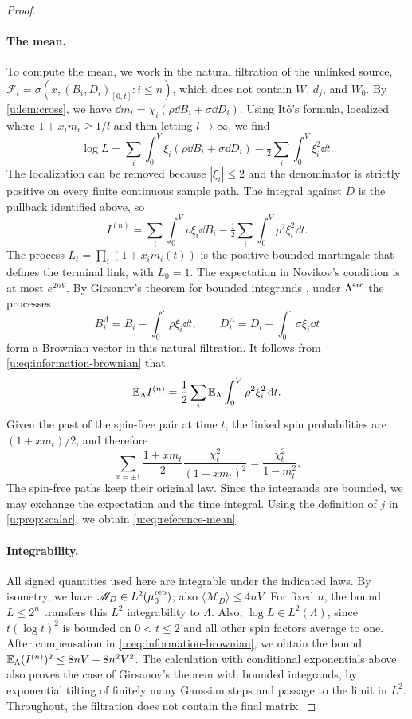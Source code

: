 \begin{proof}
\paragraph{The mean.}
To compute the mean, we work in the natural filtration of the unlinked source,
$\mathcal F_t=\sigma(x,(B_i,D_i)_{[0,t]}:i\le n)$, which does not contain $W$,
$d_j$, and $W_0$. By \cref{u:lem:cross}, we have
$\dd m_i=\chi_i(\rho\dd B_i+\sigma\dd D_i)$. Using It\^o's formula,
localized where $1+x_i m_i\ge1/l$ and then letting $l\to\infty$, we find
\[
 \log L=\sum_i\int_0^V\xi_i(\rho\dd B_i+\sigma\dd D_i)
                         -\tfrac12\sum_i\int_0^V\xi_i^2\dd t.
\]
The localization can be removed because $|\xi_i|\le2$ and the denominator is
strictly positive on every finite continuous sample path.
The integral against $D$ is the pullback identified above, so
\begin{equation}\label{u:eq:information-brownian}
 I^{(n)}=\sum_i\int_0^V\rho\xi_i\dd B_i
                        -\tfrac12\sum_i\int_0^V\rho^2\xi_i^2\dd t.
\end{equation}
The process $L_t=\prod_i(1+x_i m_i(t))$ is the positive bounded
martingale that defines the terminal link, with $L_0=1$.
The expectation in Novikov's condition is at most $e^{2nV}$.
By Girsanov's theorem for bounded integrands
\cite[Theorem~3.5.1]{karatzas-shreve-1991}, under $\Lambda^{\rm src}$
the processes
\[
 B_i^\Lambda=B_i-\int_0^\cdot\rho\xi_i\dd t,\qquad
 D_i^\Lambda=D_i-\int_0^\cdot\sigma\xi_i\dd t
\]
form a Brownian vector in this natural filtration.
It follows from \eqref{u:eq:information-brownian} that
\[
 \mathbb E_\Lambda I^{(n)}
   =\frac12\sum_i\mathbb E_\Lambda\int_0^V\rho^2\xi_i^2\,\mathrm d t.
\]
Given the past of the spin-free pair at time $t$, the linked spin probabilities
are $(1+x m_t)/2$, and therefore
\[
 \sum_{x=\pm1}\frac{1+x m_t}{2}
       \frac{\chi_t^2}{(1+x m_t)^2}=\frac{\chi_t^2}{1-m_t^2}.
\]
The spin-free paths keep their original law. Since the integrands
are bounded, we may exchange the expectation and the time integral. Using the definition of $j$ in \cref{u:prop:scalar}, we obtain
\eqref{u:eq:reference-mean}.

\paragraph{Integrability.}
All signed quantities used here are integrable under the indicated
laws. By isometry, we have $\mathscr M_D\in L^2(\mu^{\rm rep}_0)$; also
$\langle\mathscr M_D\rangle\le4nV$.
For fixed $n$, the bound $L\le2^n$ transfers this $L^2$ integrability to
$\Lambda$. Also, $\log L\in L^2(\Lambda)$, since $t(\log t)^2$ is bounded
on $0<t\le2$ and all other spin factors average to one.
After compensation in \eqref{u:eq:information-brownian}, we obtain the bound
$\mathbb E_\Lambda(I^{(n)})^2\le8nV+8n^2V^2$.
The calculation with conditional exponentials above also proves the case of
Girsanov's theorem with bounded integrands, by exponential tilting of
finitely many Gaussian steps and passage to the limit in $L^2$. Throughout,
the filtration does not contain the final matrix.
\end{proof}

